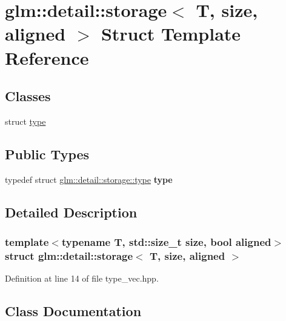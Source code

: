 \hypertarget{structglm_1_1detail_1_1storage}{}\section{glm\+:\+:detail\+:\+:storage$<$ T, size, aligned $>$ Struct Template Reference}
\label{structglm_1_1detail_1_1storage}
\subsection*{Classes}
\begin{DoxyCompactItemize}
\item 
struct \hyperlink{structglm_1_1detail_1_1storage_dc/d52/structglm_1_1detail_1_1storage_1_1type}{type}
\end{DoxyCompactItemize}
\subsection*{Public Types}
\begin{DoxyCompactItemize}
\item 
\mbox{\label{structglm_1_1detail_1_1storage_a11188a4949646a1c74aea5181fc8213d}} 
typedef struct \hyperlink{structglm_1_1detail_1_1storage_dc/d52/structglm_1_1detail_1_1storage_1_1type}{glm\+::detail\+::storage\+::type} {\bfseries type}
\end{DoxyCompactItemize}


\subsection{Detailed Description}
\subsubsection*{template$<$typename T, std\+::size\+\_\+t size, bool aligned$>$\newline
struct glm\+::detail\+::storage$<$ T, size, aligned $>$}



Definition at line 14 of file type\+\_\+vec.\+hpp.



\subsection{Class Documentation}
\label{structglm_1_1detail_1_1storage_1_1type}
